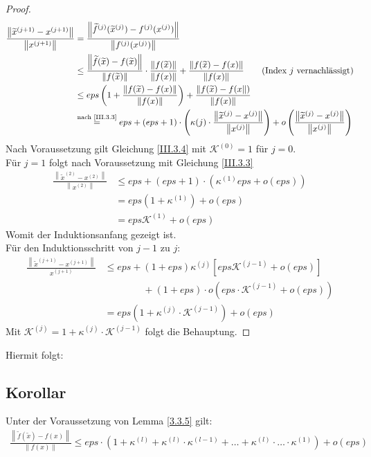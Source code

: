 \documentclass[ngerman,fontsize=11pt, paper=a4, parskip=half, titlepage=true, toc=bib]{scrbook}
\newcommand{\K}{\mathcal{K}}
\newcommand{\nn}[1]{\left\| #1 \right\|}
\begin{document}
  \begin{proof}
    \begin{align*}
      \frac{\nn{\widetilde{x}^{(j+1)}-x^{(j+1)}}}{\nn{x^{(j+1)}}}
      &= \frac{\nn{\widetilde{f}^{(j)}(\widetilde{x}^{(j)})-f^{(j)}(x^{(j)})}}
        {\nn{f^{(j)}(x^{(j)})}} \\
      &\leq \frac{\nn{\widetilde{f}(\widetilde{x})-f(\widetilde{x})}}{\nn{f(\widetilde{x})}}
        \cdot \frac{\nn{f(\widetilde{x})}}{\nn{f(x)}}
        + \frac{\nn{f(\widetilde{x})-f({x})}}{\nn{f(x)}} 
        \quad\quad \text{(Index $j$ vernachlässigt)}\\
      &\leq eps \left( 1+ \frac{\nn{f(\widetilde{x})-f({x})}}{\nn{f(x)}}\right)
        + \frac{\nn{f(\widetilde{x})-f({x}})}{\nn{f(x)}}\\
      &\overset{\text{nach \ref{III.3.3}}}{=} eps + (eps+1) \cdot 						\left(\kappa{(j)}\cdot \frac{\nn{\widetilde{x}^{(j)}-x^{(j)}}}{\nn{x^{(j)}}}\right)
        + o\left( \frac{\nn{\widetilde{x}^{(j)}-x^{(j)}}}{\nn{x^{(j)}}}\right)
    \end{align*}
    Nach Voraussetzung gilt Gleichung \eqref{III.3.4}  mit $\K^{(0)}=1$ für $j=0$. \\
    Für $j=1$ folgt nach Voraussetzung mit Gleichung \eqref{III.3.3}
    \begin{align*}
      \frac{\nn{\widetilde{x}^{(2)}-x^{(2)}}}{\nn{x^{(2)}}}
      & \leq eps +(eps+1) \cdot \left( \kappa^{(1)}eps+ o(eps)\right) \\
      &= eps(1+\kappa^{(1)}) + o(eps) \\
      &= eps\K^{(1)} + o(eps)
    \end{align*}
    Womit der Induktionsanfang gezeigt ist. \\
    Für den Induktionsschritt von $j-1$ zu $j$:
    \begin{align*}
      \frac{\nn{\widetilde{x}^{(j+1)}-x^{(j+1)}}}{x^{(j+1)}}
      & \leq eps + (1+eps)\kappa^{(j)} \left[ eps \K^{(j-1)}+ o(eps) \right] \\
      &\phantom{\leq eps+} + (1+eps) \cdot o\left( eps\cdot \K^{(j-1)} +o(eps)\right) \\
      &= eps\left(1+\kappa^{(j)}\cdot \K^{(j-1)}\right)+ o(eps)
    \end{align*}
    Mit $\K^{(j)} = 1+ \kappa^{(j)}\cdot \K^{(j-1)}$ folgt die Behauptung.
  \end{proof}

  Hiermit folgt:

  \subsection{Korollar}\label{3.3.6}
  Unter der Voraussetzung von Lemma \ref{3.3.5} gilt:
  \begin{gather}
    \frac{\nn{\widetilde{f}(\widetilde{x})-f(x)}}{\nn{f(x)}} \leq 
    eps\cdot \left( 1+\kappa^{(l)}+ \kappa^{(l)}\cdot \kappa^{(l-1)}+ \dotsc
      + \kappa^{(l)}\cdot \dotsc \cdot \kappa^{(1)}\right) + o(eps) 
    \label{III.3.5}
  \end{gather}
\end{document}
